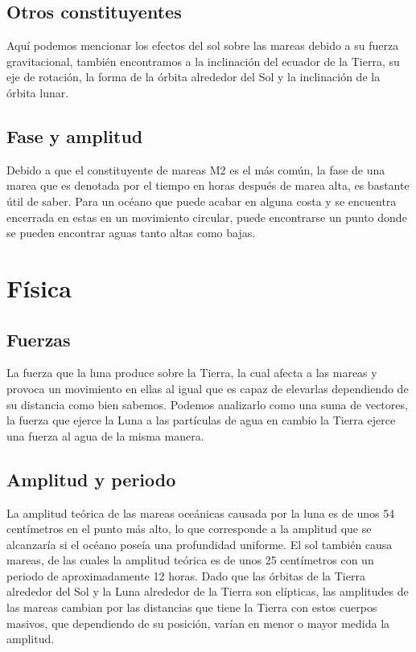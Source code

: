 \documentclass[a4paper,12pt]{article}
\begin{document}
\subsection{Otros constituyentes}
\noindent
Aquí podemos mencionar los efectos del sol sobre las mareas debido a su fuerza gravitacional, también encontramos a la inclinación del ecuador de la Tierra, su eje de rotación, la forma de la órbita alrededor del Sol y la inclinación de la órbita lunar. 

\subsection{Fase y amplitud}
\noindent
Debido a que el constituyente de mareas M2 es el más común, la fase de una marea que es denotada por el tiempo en horas después de marea alta, es bastante útil de saber. Para un océano que puede acabar en alguna costa y se encuentra encerrada en estas en un movimiento circular, puede encontrarse un punto donde se pueden encontrar aguas tanto altas como bajas.

\section{Física}   
\subsection{Fuerzas}      
\noindent
 La fuerza que la luna produce sobre la Tierra, la cual afecta a las mareas y provoca un movimiento en ellas al igual que es capaz de elevarlas dependiendo de su distancia como bien sabemos. Podemos analizarlo como una suma de vectores, la fuerza que ejerce la Luna a las partículas de agua en cambio la Tierra ejerce una fuerza al agua de la misma manera.

\subsection{Amplitud y periodo}
\noindent
La amplitud teórica de las mareas oceánicas causada por la luna es de unos 54 centímetros en el punto más alto, lo que corresponde a la amplitud que se alcanzaría si el océano poseía una profundidad uniforme. El sol también causa mareas, de las cuales la amplitud teórica es de unos 25 centímetros con un periodo de aproximadamente 12 horas. Dado que las órbitas de la Tierra alrededor del Sol y la Luna alrededor de la Tierra son elípticas, las amplitudes de las mareas cambian por las distancias que tiene la Tierra con estos cuerpos masivos, que dependiendo de su posición, varían en menor o mayor medida la amplitud.
\end{document}
